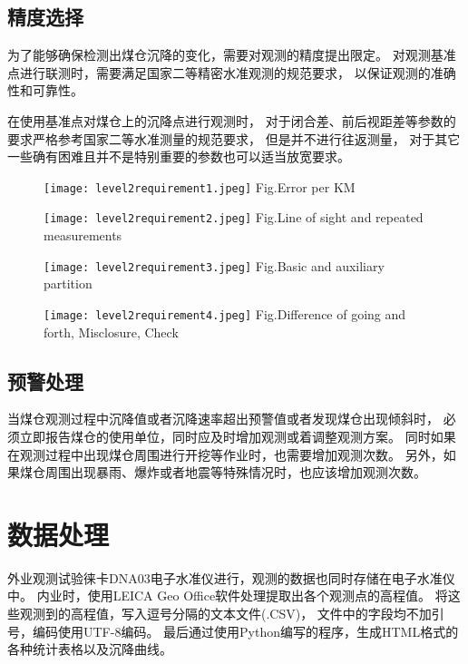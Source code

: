 \subsection{精度选择}
为了能够确保检测出煤仓沉降的变化，需要对观测的精度提出限定。
对观测基准点进行联测时，需要满足国家二等精密水准观测的规范要求，
以保证观测的准确性和可靠性。

在使用基准点对煤仓上的沉降点进行观测时，
对于闭合差、前后视距差等参数的要求严格参考国家二等水准测量的规范要求，
但是并不进行往返测量，
对于其它一些确有困难且并不是特别重要的参数也可以适当放宽要求。
\begin{figure}[!h]
   \centering
   \texttt{[image: level2requirement1.jpeg]}
								{Fig.}{Error per KM}
\end{figure}

\begin{figure}[!h]
   \centering
   \texttt{[image: level2requirement2.jpeg]}
						{Fig.}{Line of sight and repeated measurements}
\end{figure}

\begin{figure}[!h]
   \centering
   \texttt{[image: level2requirement3.jpeg]}
								{Fig.}{Basic and auxiliary partition}
\end{figure}

\begin{figure}[!h]
   \centering
   \texttt{[image: level2requirement4.jpeg]}
			{Fig.}{Difference of going and forth, Misclosure, Check}
\end{figure}

\newpage
\subsection{预警处理}
当煤仓观测过程中沉降值或者沉降速率超出预警值或者发现煤仓出现倾斜时，
必须立即报告煤仓的使用单位，同时应及时增加观测或着调整观测方案。
同时如果在观测过程中出现煤仓周围进行开挖等作业时，也需要增加观测次数。
另外，如果煤仓周围出现暴雨、爆炸或者地震等特殊情况时，也应该增加观测次数。


\section{数据处理}
外业观测试验徕卡DNA03电子水准仪进行，观测的数据也同时存储在电子水准仪中。
内业时，使用LEICA Geo Office软件处理提取出各个观测点的高程值。
将这些观测到的高程值，写入逗号分隔的文本文件(.CSV)，
文件中的字段均不加引号，编码使用UTF-8编码。
最后通过使用Python编写的程序，生成HTML格式的各种统计表格以及沉降曲线。

